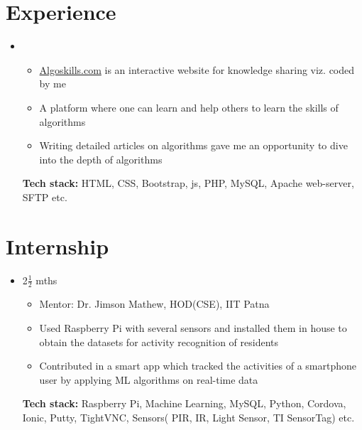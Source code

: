 \documentclass[11pt,a4paper,SANS]{moderncv}        %
\begin{document}
\makecvtitle


\section{Experience}

\vspace{6pt}

\begin{itemize}

\item{ {}{}
{\vspace{4pt}
\begin{itemize}
\item {\color{blue}\href{www.algoskills.com/home.php}{Algoskills.com}} is an interactive website for knowledge sharing viz. coded by me 
\item A platform where one can learn and help others to learn the skills of algorithms 
\item Writing detailed articles on algorithms gave me an opportunity to dive into the depth of algorithms\medskip
\end{itemize}
 \textbf{Tech stack: } HTML, CSS, Bootstrap, js, PHP, MySQL, Apache web-server, SFTP etc.}}

\vspace{6pt}
\end{itemize}

\section{Internship}

\vspace{6pt}

\begin{itemize}

\item{ {2\textbf{\(\frac{1}{2}\)} mths}{}
{\vspace{4pt} 
\begin{itemize}
\item Mentor: Dr. Jimson Mathew, HOD(CSE), IIT Patna
\item Used Raspberry Pi with several sensors and installed them in house to obtain the datasets for activity recognition of residents
\item Contributed in a smart app which tracked the activities of a smartphone user by applying ML algorithms on real-time data
\end{itemize}
\medskip 
 \textbf{Tech stack: } Raspberry Pi, Machine Learning, MySQL, Python, Cordova, Ionic, Putty, TightVNC, Sensors( PIR, IR, Light Sensor, TI SensorTag) etc. }}

\vspace{6pt}
\end{itemize}
\end{document}
